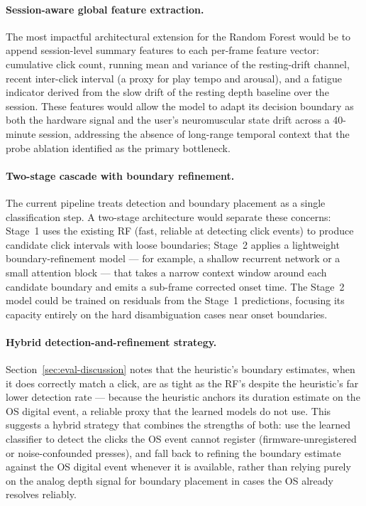 \paragraph{Session-aware global feature extraction.}
The most impactful architectural extension for the Random Forest would be to
append session-level summary features to each per-frame feature vector:
cumulative click count, running mean and variance of the resting-drift channel,
recent inter-click interval (a proxy for play tempo and arousal), and a fatigue
indicator derived from the slow drift of the resting depth baseline over the
session. These features would allow the model to adapt its decision boundary as
both the hardware signal and the user's neuromuscular state drift across a
40-minute session, addressing the absence of long-range temporal context that
the probe ablation identified as the primary bottleneck.

\paragraph{Two-stage cascade with boundary refinement.}
The current pipeline treats detection and boundary placement as a single
classification step. A two-stage architecture would separate these concerns:
Stage~1 uses the existing RF (fast, reliable at detecting click events) to produce
candidate click intervals with loose boundaries; Stage~2 applies a lightweight
boundary-refinement model --- for example, a shallow recurrent network or a
small attention block --- that takes a narrow context window around each candidate
boundary and emits a sub-frame corrected onset time. The Stage~2 model could be
trained on residuals from the Stage~1 predictions, focusing its capacity entirely
on the hard disambiguation cases near onset boundaries.

\paragraph{Hybrid detection-and-refinement strategy.}
Section~\ref{sec:eval-discussion} notes that the heuristic's boundary estimates,
when it does correctly match a click, are as tight as the RF's despite the
heuristic's far lower detection rate --- because the heuristic anchors its
duration estimate on the OS digital event, a reliable proxy that the learned
models do not use. This suggests a hybrid strategy that combines the strengths
of both: use the learned classifier to detect the clicks the OS event cannot
register (firmware-unregistered or noise-confounded presses), and fall back to
refining the boundary estimate against the OS digital event whenever it is
available, rather than relying purely on the analog depth signal for boundary
placement in cases the OS already resolves reliably.

